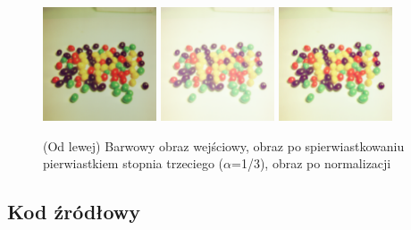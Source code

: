 \documentclass[final,a4paper,openany,12pt]{mwbk}
\begin{document}
\begin{figure}[H]
	\begin{center}
		\includegraphics[width=0.3\textwidth]{2/2Color_Sqrt_Original}
		\includegraphics[width=0.3\textwidth]{2/2Color_Sqrt_Result}
		\includegraphics[width=0.3\textwidth]{2/2Color_Sqrt_Result_Norm}
	\end{center}
	\caption{(Od lewej) Barwowy obraz wejściowy, obraz po spierwiastkowaniu pierwiastkiem stopnia trzeciego ($\alpha$=1/3), obraz po normalizacji }
\end{figure}

\subsection*{Kod źródłowy}
\end{document}
